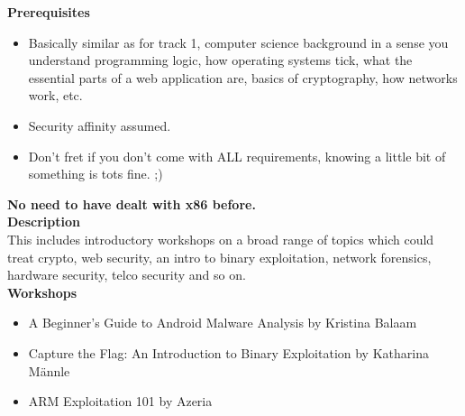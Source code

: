 \def\abstracttitle{Introduction to Hack All the Things}
\def\abstractcomment{Track 2 [Beginners / Intermediate]}
\def\abstractowner{Various}

\thispagestyle{abstract}

  \textbf{Prerequisites}
  \begin{itemize}
  	\item Basically similar as for track 1, computer science background in a sense you understand programming logic, how operating systems tick, what the essential parts of a web application are, basics of cryptography, how networks work, etc.
    \item Security affinity assumed.
    \item Don't fret if you don't come with ALL requirements, knowing a little bit of something is tots fine. ;)
  \end{itemize}

  \textbf{No need to have dealt with x86 before.}\\

  \textbf{Description}\\

  This includes introductory workshops on a broad range of topics which could treat crypto, web security, an intro to binary exploitation, network forensics, hardware security, telco security and so on.\\

  \textbf{Workshops}
  \begin{itemize}
  	\item A Beginner's Guide to Android Malware Analysis by Kristina Balaam
    \item Capture the Flag: An Introduction to Binary Exploitation by Katharina Männle
    \item ARM Exploitation 101 by Azeria
  \end{itemize}
